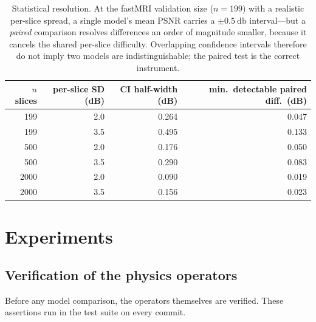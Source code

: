 \documentclass[11pt]{article}
\begin{document}
\begin{table}[h]
\centering
\small
\begin{tabular}{@{}rrrr@{}}
\toprule
$n$ slices & per-slice SD (dB) & CI half-width (dB) & min.\ detectable paired diff.\ (dB) \\
\midrule
199  & 2.0 & 0.264 & 0.047 \\
199  & 3.5 & 0.495 & 0.133 \\
500  & 2.0 & 0.176 & 0.050 \\
500  & 3.5 & 0.290 & 0.083 \\
2000 & 2.0 & 0.090 & 0.019 \\
2000 & 3.5 & 0.156 & 0.023 \\
\bottomrule
\end{tabular}
\caption{Statistical resolution. At the fastMRI validation size ($n = 199$) with
a realistic per-slice spread, a single model's mean PSNR carries a
$\pm\SI{0.5}{\decibel}$ interval---but a \emph{paired} comparison resolves
differences an order of magnitude smaller, because it cancels the shared
per-slice difficulty. Overlapping confidence intervals therefore do not imply
two models are indistinguishable; the paired test is the correct instrument.}
\label{tab:resolution}
\end{table}

\section{Experiments}

\subsection{Verification of the physics operators}
\label{sec:verification}

Before any model comparison, the operators themselves are verified. These
assertions run in the test suite on every commit.
\end{document}
